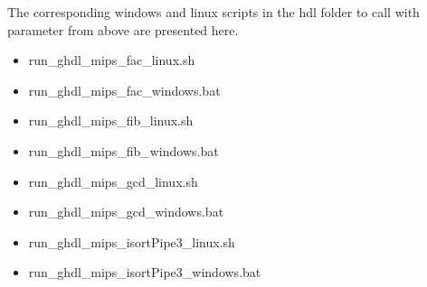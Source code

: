 \begin{table}[h]
	\end{table}

The corresponding windows and linux scripts in the hdl folder to call with parameter from above are presented here.  
\begin{itemize}
\item  run\_ghdl\_mips\_fac\_linux.sh
\item  run\_ghdl\_mips\_fac\_windows.bat
\item  run\_ghdl\_mips\_fib\_linux.sh
\item  run\_ghdl\_mips\_fib\_windows.bat
\item  run\_ghdl\_mips\_gcd\_linux.sh
\item  run\_ghdl\_mips\_gcd\_windows.bat
\item  run\_ghdl\_mips\_isortPipe3\_linux.sh
\item  run\_ghdl\_mips\_isortPipe3\_windows.bat
\end{itemize}
 
 
 






